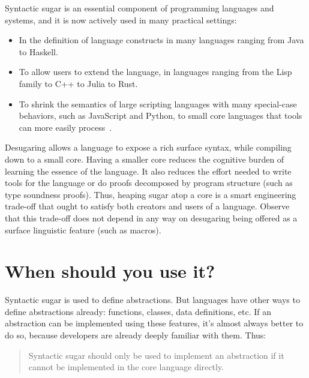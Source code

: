 Syntactic sugar is an essential component of programming languages and
systems, and it is now actively used in many practical settings:
\begin{itemize}
\item In the definition of language constructs in many languages
  ranging from Java to Haskell.
\item To allow users to extend the language, in languages ranging from the Lisp
  family to C++ to Julia to Rust.
\item To shrink the semantics of large scripting languages with many
  special-case behaviors, such as JavaScript and Python, to small core
  languages that tools can more easily process~\cite{lambda-js,politz:s5,politz:python}.
\end{itemize}
Desugaring allows a language to expose a rich surface syntax, while
compiling down to a small core. Having a smaller core reduces the
cognitive burden of learning the essence of the language. It also
reduces the effort needed to write tools for the language or do proofs
decomposed by program structure (such as type soundness proofs). Thus,
heaping sugar atop a core is a smart engineering trade-off that ought
to satisfy both creators and users of a language. Observe that this
trade-off does not depend in any way on desugaring being offered as a
surface linguistic feature (such as macros).


\section{When should you use it?}

Syntactic sugar is used to define abstractions. But languages have
other ways to define abstractions already: functions, classes, data
definitions, etc. If an abstraction can be implemented using these
features, it's almost always better to do so, because developers are
already deeply familiar with them. Thus:
\begin{quote}
  Syntactic sugar should only be used to implement an abstraction if
  it cannot be implemented in the core language directly.
\end{quote}


